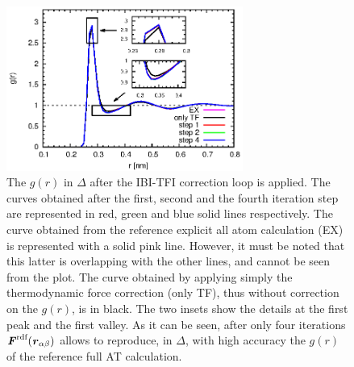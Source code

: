\documentclass[aps,prb,preprint,citeautoscript]{revtex4}
\renewcommand{\v}[1]{\textbf{\textit{#1}}}
\begin{document}
\begin{figure}
  \centering
  \includegraphics[width=0.69\textwidth]{rdf.eps}
  \caption{The $g(r)$ in $\Delta$ after the IBI-TFI correction loop is applied.  The
    curves obtained after the first, second and the fourth iteration step are represented in red, green and blue solid lines respectively.  The
    curve obtained from the reference explicit all atom calculation (EX) is represented with a solid pink line. However, it must be noted that this latter 
is overlapping with the other lines, and cannot be seen from the
    plot. The curve obtained by applying simply the thermodynamic force correction (only TF),  thus without
    correction on the $g(r)$, is in black. The two insets
    show the details at the
    first peak and the first valley. As it can be seen, after only four iterations $\v F^{\textrm{rdf}}(\v r_{\alpha\beta})$ allows to reproduce, in $\Delta$, with high accuracy the $g(r)$ of the reference full AT calculation.}
  \label{fig:tmp4}
\end{figure} 
\end{document}

